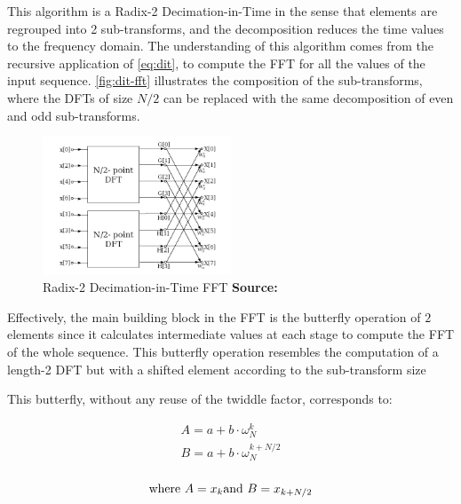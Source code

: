 \documentclass[
  oneside,
  11pt, a4paper,
  footinclude=true,
  headinclude=true,
  cleardoublepage=empty
]{scrbook}
\newcommand*{\source}[1]{%
    \textbf{Source:} \cite{#1}%
}
\begin{document}


This algorithm is a Radix-2 Decimation-in-Time in the sense that elements are regrouped into 2 sub-transforms, and the decomposition reduces the time values to the frequency domain. The understanding of this algorithm comes from the recursive application of \autoref{eq:dit}, to compute the FFT for all the values of the input sequence. \autoref{fig:dit-fft} illustrates the composition of the sub-transforms, where the DFTs of size $N/2$ can be replaced with the same decomposition of even and odd sub-transforms.


\begin{figure}[h] 
    \centering
    \includegraphics[width=0.5\textwidth]{img/dit_fft.png}
    \caption{Radix-2 Decimation-in-Time FFT \source{jones2014digital}}
    \label{fig:dit-fft}
\end{figure}


Effectively, the main building block in the FFT is the butterfly operation of $2$ elements since it calculates intermediate values at each stage to compute the FFT of the whole sequence. This butterfly operation resembles the computation of a length-2 DFT but with a shifted element according to the sub-transform size

This butterfly, without any reuse of the twiddle factor, corresponds to:

\begin{equation} \label{eq:dit}
    \begin{split}
    A = a + b \cdot \omega_{N}^{k} \\
    B = a + b \cdot \omega_{N}^{k+N/2} \\
    \end{split}
\end{equation}

\begin{equation*}
    \text{where } A = x_{k} \\ \text{and } B = x_{k+N/2} \\
\end{equation*}
\end{document}
